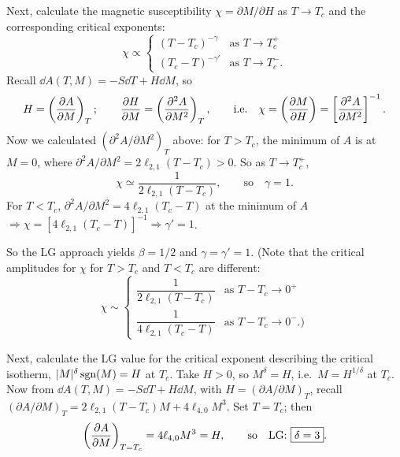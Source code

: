 Next, calculate the magnetic susceptibility $\chi = \partial M/\partial H$ as $T\to T_c$ and the
corresponding critical exponents:
\begin{equation}
  \chi\propto
  \begin{cases}
    (T-T_c)^{-\gamma} & \text{as } T\to T_c^+\\
    (T_c-T)^{-\gamma'} & \text{as } T\to T_c^- .
  \end{cases}
\end{equation}
Recall $\dd A(T,M) = -S\dd T + H\dd M$, so
\begin{equation}
  H = \left(\frac{\partial A}{\partial M}\right)_T;\qquad \frac{\partial H}{\partial M} = \left(\frac{\partial^2A}{\partial M^2}\right)_T,
  \qquad\text{i.e.}\quad \chi = \left(\frac{\partial M}{\partial H}\right) = \left[\frac{\partial^2A}{\partial M^2}\right]^{-1}.
\end{equation}
Now we calculated $(\partial^2A/\partial M^2)_T$ above: for $T>T_c$, the minimum of $A$ is at
$M = 0$, where $\partial^2A/\partial M^2 = 2\ell_{2,1}(T-T_c)>0$. So as $T\to T_c^+$,
\begin{equation}
  \chi\simeq\frac{1}{2\ell_{2,1}(T-T_c)},\qquad\text{so}\quad\boxed{\gamma = 1}.
\end{equation}
For $T<T_c$, $\partial^2A/\partial M^2 = 4\ell_{2,1}(T_c-T)$ at the minimum of $A$
$\Rightarrow\chi = [4\ell_{2,1}(T_c-T)]^{-1}\Rightarrow\gamma' = 1$.

So the LG approach yields $\beta = 1/2$ and $\gamma = \gamma' = 1$. (Note that the critical
amplitudes for $\chi$ for $T>T_c$ and $T<T_c$ are different:
\begin{equation}
  \chi\sim
  \begin{cases}
    \dfrac{1}{2\ell_{2,1}(T-T_c)} & \text{as } T-T_c\to 0^+\\[8pt]
    \dfrac{1}{4\ell_{2,1}(T_c-T)} & \text{as } T-T_c\to 0^- .)
  \end{cases}
\end{equation}

Next, calculate the LG value for the critical exponent describing the critical isotherm,
$|M|^\delta\operatorname{sgn}(M) = H$ at $T_c$. Take $H>0$, so $M^\delta = H$, i.e.\ $M = H^{1/\delta}$ at $T_c$.
Now from $\dd A(T,M) = -S\dd T + H\dd M$, with $H = (\partial A/\partial M)_T$, recall
$(\partial A/\partial M)_T = 2\ell_{2,1}(T-T_c)M + 4\ell_{4,0}M^3$. Set $T = T_c$; then
\begin{equation}
  \left(\frac{\partial A}{\partial M}\right)_{T=T_c} = 4\ell_{4,0}M^3 = H,\qquad\text{so}\quad
  \text{LG:}\ \boxed{\delta = 3}.
\end{equation}

